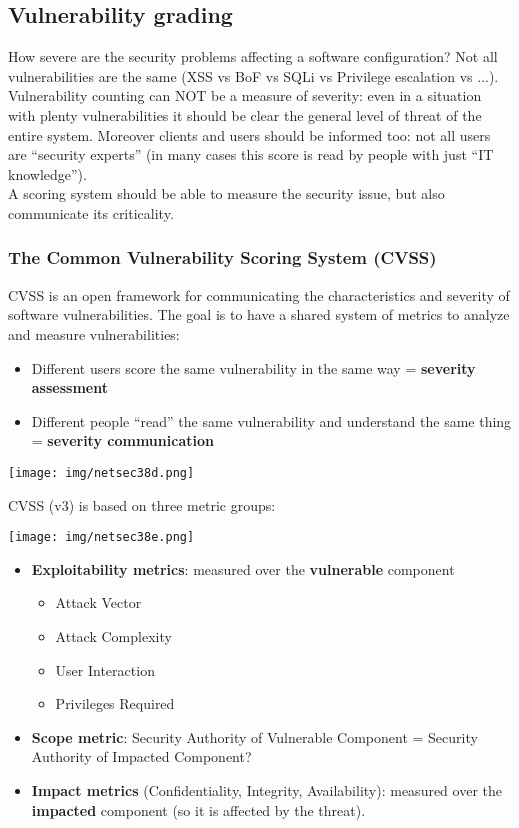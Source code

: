 \documentclass[a4paper, 10pt, titlepage]{article}
\begin{document}
\subsection{Vulnerability grading}
How severe are the security problems affecting a software configuration? Not all vulnerabilities are the same (XSS vs BoF vs SQLi vs Privilege escalation vs ...). Vulnerability counting can NOT be a measure of severity: even in a situation with plenty vulnerabilities it should be clear the general level of threat of the entire system. Moreover clients and users should be informed too: not all users are “security experts” (in many cases this score is read by people with just “IT knowledge”). \medskip\\ A scoring system should be able to measure the security issue, but also  communicate its criticality.

\subsubsection*{The Common Vulnerability Scoring System (CVSS)}
CVSS is an open framework for communicating the characteristics and severity of software vulnerabilities. The goal is to have a shared system of metrics to analyze and measure vulnerabilities:
\begin{itemize}
	\item Different users score the same vulnerability in the same way = \textbf{severity assessment}
	\item Different people “read” the same vulnerability and
	understand the same thing = \textbf{severity communication}
\end{itemize}
\begin{center}
	\texttt{[image: img/netsec38d.png]}
\end{center}
CVSS (v3) is based on three metric groups:
\begin{center}
	\texttt{[image: img/netsec38e.png]}
\end{center}
\begin{itemize}
	\item \textbf{Exploitability metrics}: measured over the \textbf{vulnerable} component
	\begin{itemize}
		\item Attack Vector
		\item Attack Complexity
		\item User Interaction
		\item Privileges Required
	\end{itemize}
	\item \textbf{Scope metric}: Security Authority of Vulnerable Component = Security Authority of Impacted Component?
	\item \textbf{Impact metrics} (Confidentiality, Integrity, Availability): measured over the \textbf{impacted} component (so it is affected by the threat).	
\end{itemize}
\end{document}
